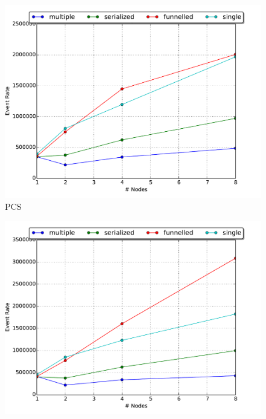 \documentclass[11pt]{book}
\begin{document}
\begin{figure}
  \begin{minipage}{.5\textwidth}
    \begin{center}
      \includegraphics[width=\textwidth,keepaspectratio,quiet]{figs/partitioning_communication/communication_pcs_eventrate.pdf} \\
      PCS \\
    \end{center}
  \end{minipage}%
  \begin{minipage}{.5\textwidth}
    \begin{center}
      \includegraphics[width=\textwidth,keepaspectratio,quiet]{figs/partitioning_communication/communication_traffic_eventrate.pdf} \\

\end{center}
\end{minipage}
\end{figure}
\end{document}
